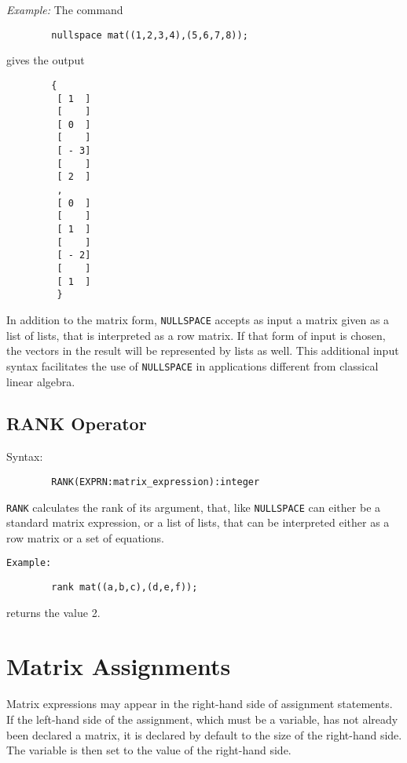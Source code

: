 {\it Example:} The command
\begin{verbatim}
        nullspace mat((1,2,3,4),(5,6,7,8));
\end{verbatim}
   gives the output
 
\begin{verbatim}
        {
         [ 1  ]
         [    ]
         [ 0  ]
         [    ]
         [ - 3]
         [    ]
         [ 2  ]
         ,
         [ 0  ]
         [    ]
         [ 1  ]
         [    ]
         [ - 2]
         [    ]
         [ 1  ]
         }
\end{verbatim}
 
In addition to the {\REDUCE} matrix form, {\tt NULLSPACE} accepts as input a
matrix given as a list of lists, that is interpreted as a row matrix.  If
that form of input is chosen, the vectors in the result will be
represented by lists as well.  This additional input syntax facilitates
the use of {\tt NULLSPACE} in applications different from classical linear
algebra.

\subsection{RANK Operator}
\hypertarget{operator:RANK}{}
 
Syntax:
\begin{verbatim}
        RANK(EXPRN:matrix_expression):integer
\end{verbatim}
{\tt RANK} calculates the rank of its argument, that, like {\tt NULLSPACE}
can either be a standard matrix expression, or a list of lists, that can
be interpreted either as a row matrix or a set of equations.

{\tt Example:}

\begin{verbatim}
        rank mat((a,b,c),(d,e,f));
\end{verbatim}
returns the value 2.

\section{Matrix Assignments} 

Matrix expressions may appear in the right-hand side of assignment
statements. If the left-hand side of the assignment, which must be a
variable, has not already been declared a matrix, it is declared by default
to the size of the right-hand side. The variable is then set to the value
of the right-hand side.


